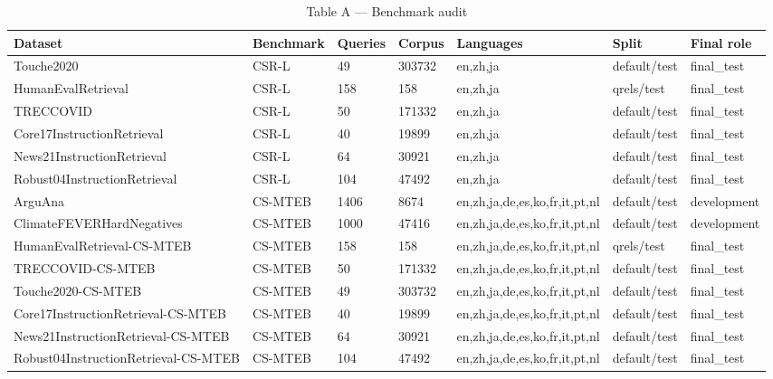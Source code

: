 \begin{table}[ht]
\centering
\caption{Table A — Benchmark audit}
\begin{tabular}{lllllll}
\hline
Dataset & Benchmark & Queries & Corpus & Languages & Split & Final role \\
\hline
Touche2020 & CSR-L & 49 & 303732 & en,zh,ja & default/test & final\_test \\
HumanEvalRetrieval & CSR-L & 158 & 158 & en,zh,ja & qrels/test & final\_test \\
TRECCOVID & CSR-L & 50 & 171332 & en,zh,ja & default/test & final\_test \\
Core17InstructionRetrieval & CSR-L & 40 & 19899 & en,zh,ja & default/test & final\_test \\
News21InstructionRetrieval & CSR-L & 64 & 30921 & en,zh,ja & default/test & final\_test \\
Robust04InstructionRetrieval & CSR-L & 104 & 47492 & en,zh,ja & default/test & final\_test \\
ArguAna & CS-MTEB & 1406 & 8674 & en,zh,ja,de,es,ko,fr,it,pt,nl & default/test & development \\
ClimateFEVERHardNegatives & CS-MTEB & 1000 & 47416 & en,zh,ja,de,es,ko,fr,it,pt,nl & default/test & development \\
HumanEvalRetrieval-CS-MTEB & CS-MTEB & 158 & 158 & en,zh,ja,de,es,ko,fr,it,pt,nl & qrels/test & final\_test \\
TRECCOVID-CS-MTEB & CS-MTEB & 50 & 171332 & en,zh,ja,de,es,ko,fr,it,pt,nl & default/test & final\_test \\
Touche2020-CS-MTEB & CS-MTEB & 49 & 303732 & en,zh,ja,de,es,ko,fr,it,pt,nl & default/test & final\_test \\
Core17InstructionRetrieval-CS-MTEB & CS-MTEB & 40 & 19899 & en,zh,ja,de,es,ko,fr,it,pt,nl & default/test & final\_test \\
News21InstructionRetrieval-CS-MTEB & CS-MTEB & 64 & 30921 & en,zh,ja,de,es,ko,fr,it,pt,nl & default/test & final\_test \\
Robust04InstructionRetrieval-CS-MTEB & CS-MTEB & 104 & 47492 & en,zh,ja,de,es,ko,fr,it,pt,nl & default/test & final\_test \\
\hline
\end{tabular}
\end{table}
